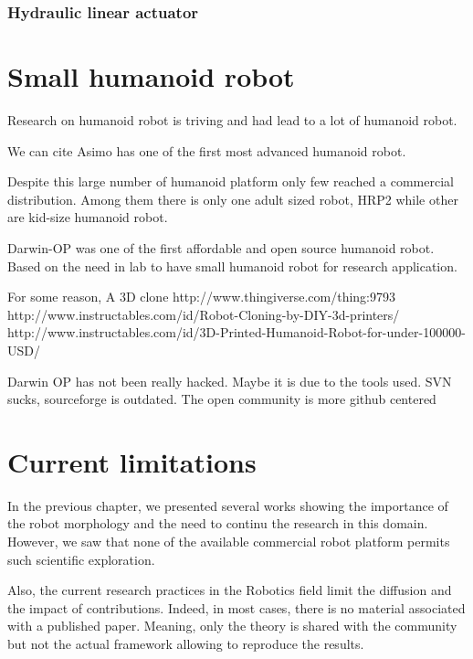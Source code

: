\subsubsection{Hydraulic linear actuator} %


\section{Small humanoid robot} %
Research on humanoid robot is triving and had lead to a lot of humanoid robot.

We can cite Asimo has one of the first most advanced humanoid robot.

Despite this large number of humanoid platform only few reached a commercial distribution.
Among them there is only one adult sized robot, HRP2 while other are kid-size humanoid robot.

Darwin-OP was one of the first affordable and open source humanoid robot.
Based on the need in lab to have small  humanoid robot for research application.

For some reason, A 3D clone http://www.thingiverse.com/thing:9793
http://www.instructables.com/id/Robot-Cloning-by-DIY-3d-printers/
http://www.instructables.com/id/3D-Printed-Humanoid-Robot-for-under-100000-USD/

Darwin OP has not been really hacked.
Maybe it is due to the tools used.
SVN sucks, sourceforge is outdated.
The open community is more github centered


\section{Current limitations}

In the previous chapter, we presented several works showing the importance of the robot morphology and the need to continu the research in this domain.
However, we saw that none of the available commercial robot platform permits such scientific exploration.

Also, the current research practices in the Robotics field limit the diffusion and the impact of contributions.
Indeed, in most cases, there is no material associated with a published paper.
Meaning, only the theory is shared with the community but not the actual framework allowing to reproduce the results.

